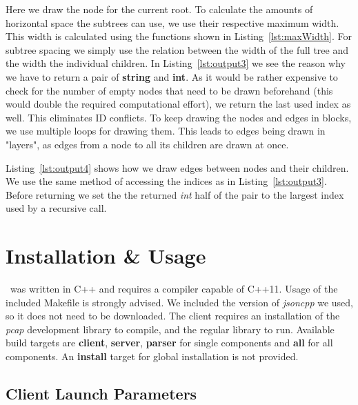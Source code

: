 
Here we draw the node for the current root.
To calculate the amounts of horizontal space the subtrees can use, we use their respective maximum width.
This width is calculated using the functions shown in Listing~\ref{lst:maxWidth}.
For subtree spacing we simply use the relation between the width of the full tree and the width the individual children.
In Listing~\ref{lst:output3} we see the reason why we have to return a pair of \textbf{string} and \textbf{int}.
As it would be rather expensive to check for the number of empty nodes that need to be drawn beforehand (this would double the required computational effort), we return the last used index as well.
This eliminates ID conflicts.
To keep drawing the nodes and edges in blocks, we use multiple loops for drawing them.
This leads to edges being drawn in "layers", as edges from a node to all its children are drawn at once.


Listing~\ref{lst:output4} shows how we draw edges between nodes and their children.
We use the same method of accessing the indices as in Listing~\ref{lst:output3}.
Before returning we set the the returned \textit{int} half of the pair to the largest index used by a recursive call.



\section{Installation \& Usage}
\tool\ was written in C++ and requires a compiler capable of C++11.
Usage of the included Makefile is strongly advised.
We included the version of \textit{jsoncpp} we used, so it does not need to be downloaded.
The client requires an installation of the \textit{pcap} development library to compile, and the regular library to run.
Available build targets are \textbf{client}, \textbf{server}, \textbf{parser} for single components and \textbf{all} for all components.
An \textbf{install} target for global installation is not provided.
\subsection*{Client Launch Parameters}
